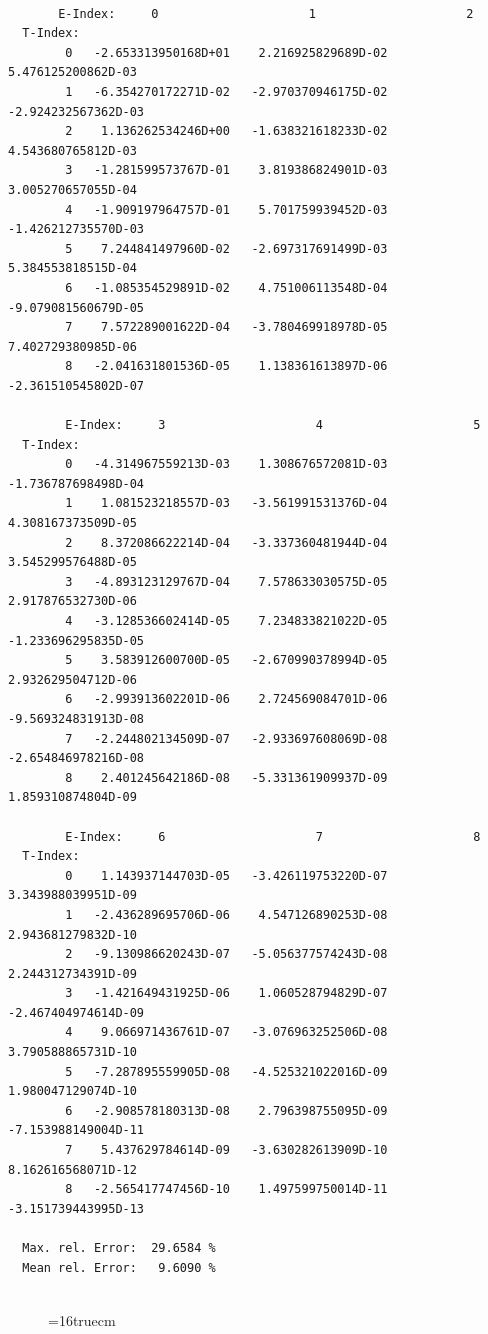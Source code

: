\documentclass[12pt,dvips]{article}
\begin{document}
\begin{small}\begin{verbatim}

       E-Index:     0                     1                     2
  T-Index:
        0   -2.653313950168D+01    2.216925829689D-02    5.476125200862D-03
        1   -6.354270172271D-02   -2.970370946175D-02   -2.924232567362D-03
        2    1.136262534246D+00   -1.638321618233D-02    4.543680765812D-03
        3   -1.281599573767D-01    3.819386824901D-03    3.005270657055D-04
        4   -1.909197964757D-01    5.701759939452D-03   -1.426212735570D-03
        5    7.244841497960D-02   -2.697317691499D-03    5.384553818515D-04
        6   -1.085354529891D-02    4.751006113548D-04   -9.079081560679D-05
        7    7.572289001622D-04   -3.780469918978D-05    7.402729380985D-06
        8   -2.041631801536D-05    1.138361613897D-06   -2.361510545802D-07

        E-Index:     3                     4                     5
  T-Index:
        0   -4.314967559213D-03    1.308676572081D-03   -1.736787698498D-04
        1    1.081523218557D-03   -3.561991531376D-04    4.308167373509D-05
        2    8.372086622214D-04   -3.337360481944D-04    3.545299576488D-05
        3   -4.893123129767D-04    7.578633030575D-05    2.917876532730D-06
        4   -3.128536602414D-05    7.234833821022D-05   -1.233696295835D-05
        5    3.583912600700D-05   -2.670990378994D-05    2.932629504712D-06
        6   -2.993913602201D-06    2.724569084701D-06   -9.569324831913D-08
        7   -2.244802134509D-07   -2.933697608069D-08   -2.654846978216D-08
        8    2.401245642186D-08   -5.331361909937D-09    1.859310874804D-09

        E-Index:     6                     7                     8
  T-Index:
        0    1.143937144703D-05   -3.426119753220D-07    3.343988039951D-09
        1   -2.436289695706D-06    4.547126890253D-08    2.943681279832D-10
        2   -9.130986620243D-07   -5.056377574243D-08    2.244312734391D-09
        3   -1.421649431925D-06    1.060528794829D-07   -2.467404974614D-09
        4    9.066971436761D-07   -3.076963252506D-08    3.790588865731D-10
        5   -7.287895559905D-08   -4.525321022016D-09    1.980047129074D-10
        6   -2.908578180313D-08    2.796398755095D-09   -7.153988149004D-11
        7    5.437629784614D-09   -3.630282613909D-10    8.162616568071D-12
        8   -2.565417747456D-10    1.497599750014D-11   -3.151739443995D-13

  Max. rel. Error:  29.6584 %
  Mean rel. Error:   9.6090 %


\end{verbatim}\end{small}
\begin{figure} \label{2.3.8rl}
\epsfxsize=16truecm 
\end{figure}
\newpage
\end{document}
